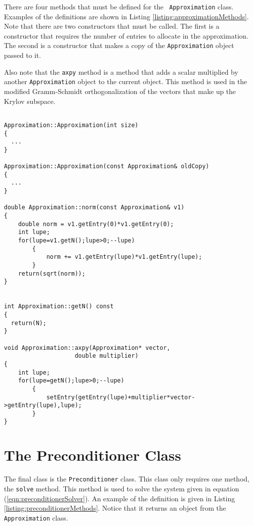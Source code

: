 There are four methods that must be defined for the {\tt
  Approximation} class. Examples of the definitions are shown in
Listing \ref{listing:approximationMethods}. Note that there are two
constructors that must be called. The first is a constructor that
requires the number of entries to allocate in the approximation. The
second is a constructor that makes a copy of the {\tt Approximation}
object passed to it.

Also note that the {\tt axpy} method is a method that adds a scalar
multiplied by another {\tt Approximation} object to the current
object. This method is used in the modified Gramm-Schmidt
orthogonalization of the vectors that make up the Krylov subspace.

\begin{lstlisting}[caption={An example of the methods that must be
    defined for the {\tt Approximation} class.},
                   basicstyle=\scriptsize,
                   label=listing:approximationMethods]

Approximation::Approximation(int size)
{
  ...
}

Approximation::Approximation(const Approximation& oldCopy)
{
  ...
}

double Approximation::norm(const Approximation& v1)
{
	double norm = v1.getEntry(0)*v1.getEntry(0);
	int lupe;
	for(lupe=v1.getN();lupe>0;--lupe)
		{
			norm += v1.getEntry(lupe)*v1.getEntry(lupe);
		}
	return(sqrt(norm));
}


int Approximation::getN() const
{
  return(N);
}

void Approximation::axpy(Approximation* vector,
					double multiplier)
{
	int lupe;
	for(lupe=getN();lupe>0;--lupe)
		{
			setEntry(getEntry(lupe)+multiplier*vector->getEntry(lupe),lupe);
		}
}

\end{lstlisting}



\section{The Preconditioner Class}

The final class is the {\tt Preconditioner} class. This class only
requires one method, the {\tt solve} method. This method is used to
solve the system given in equation
(\ref{eqn:preconditionerSolver}). An example of the definition is
given in Listing \ref{listing:preconditionerMethods}. Notice that it
returns an object from the {\tt Approximation} class.


